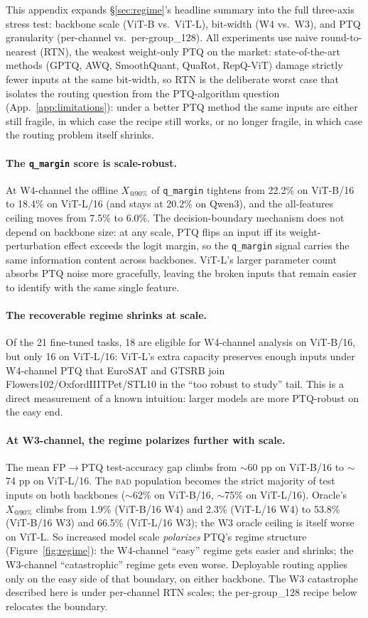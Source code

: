 \documentclass{article}
\makeatletter
\newcommand{\fp}{\textsc{FP}\xspace}
\newcommand{\ptq}{\textsc{PTQ}\xspace}
\newcommand{\bad}{\textsc{bad}\xspace}
\newcommand{\xat}[1]{\ensuremath{X_{@#1\%}}}
\makeatother
\begin{document}
This appendix expands \S\ref{sec:regime}'s headline summary into the full three-axis stress test: backbone scale (ViT-B vs.\ ViT-L), bit-width (W4 vs.\ W3), and \ptq{} granularity (per-channel vs.\ per-group\_128). All experiments use naive round-to-nearest (RTN), the weakest weight-only \ptq{} on the market: state-of-the-art methods (GPTQ, AWQ, SmoothQuant, QuaRot, RepQ-ViT) damage strictly fewer inputs at the same bit-width, so RTN is the deliberate worst case that isolates the routing question from the PTQ-algorithm question (App.~\ref{app:limitations}): under a better \ptq{} method the same inputs are either still fragile, in which case the recipe still works, or no longer fragile, in which case the routing problem itself shrinks.

\paragraph{The \texttt{q\_margin} score is scale-robust.} At W4-channel the offline \xat{90} of \texttt{q\_margin} tightens from 22.2\% on ViT-B/16 to 18.4\% on ViT-L/16 (and stays at 20.2\% on Qwen3), and the all-features ceiling moves from 7.5\% to 6.0\%. The decision-boundary mechanism does not depend on backbone size: at any scale, \ptq{} flips an input iff its weight-perturbation effect exceeds the logit margin, so the \texttt{q\_margin} signal carries the same information content across backbones. ViT-L's larger parameter count absorbs \ptq{} noise more gracefully, leaving the broken inputs that remain easier to identify with the same single feature.

\paragraph{The recoverable regime shrinks at scale.} Of the 21 fine-tuned tasks, 18 are eligible for W4-channel analysis on ViT-B/16, but only 16 on ViT-L/16: ViT-L's extra capacity preserves enough inputs under W4-channel \ptq{} that EuroSAT and GTSRB join Flowers102/OxfordIIITPet/STL10 in the ``too robust to study'' tail. This is a direct measurement of a known intuition: larger models are more \ptq-robust on the easy end.

\paragraph{At W3-channel, the regime polarizes further with scale.} The mean \fp$\to$\ptq test-accuracy gap climbs from $\sim$60 pp on ViT-B/16 to $\sim$74 pp on ViT-L/16. The \bad{} population becomes the strict majority of test inputs on both backbones ($\sim$62\% on ViT-B/16, $\sim$75\% on ViT-L/16). Oracle's \xat{90} climbs from 1.9\% (ViT-B/16 W4) and 2.3\% (ViT-L/16 W4) to 53.8\% (ViT-B/16 W3) and 66.5\% (ViT-L/16 W3); the W3 oracle ceiling is itself worse on ViT-L. So increased model scale \emph{polarizes} \ptq{}'s regime structure (Figure~\ref{fig:regime}): the W4-channel ``easy'' regime gets easier and shrinks; the W3-channel ``catastrophic'' regime gets even worse. Deployable routing applies only on the easy side of that boundary, on either backbone. The W3 catastrophe described here is under per-channel RTN scales; the per-group\_128 recipe below relocates the boundary.
\end{document}
